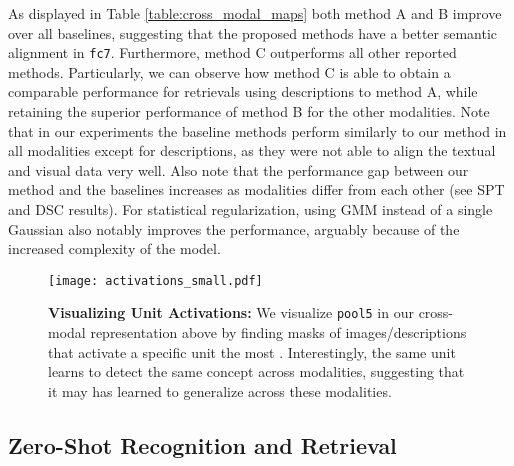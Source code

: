 \documentclass[10pt,journal,compsoc]{IEEEtran}
\begin{document}
	As displayed in Table \ref{table:cross_modal_maps} both method A and B improve over all baselines, suggesting that the proposed methods have a better semantic alignment in \texttt{fc7}. Furthermore, method C outperforms all other reported methods. Particularly, we can observe how method C is able to obtain a comparable performance for retrievals using descriptions to method A, while retaining the superior performance of method B for the other modalities. Note that in our experiments the baseline methods perform similarly to our method in all modalities except for descriptions, as they were not able to align the textual and visual data very well. Also note that the performance gap between our method and the baselines increases as modalities differ from each other (see SPT and DSC results).
	For statistical regularization, using GMM instead of a single Gaussian also notably improves the performance, arguably because of the increased complexity of the model.
	
	
	\begin{figure*}
        \begin{center}
            \texttt{[image: activations\_small.pdf]} 
        \end{center}
        \caption{\textbf{Visualizing Unit Activations:} We visualize \texttt{pool5} in our cross-modal representation above by finding masks of images/descriptions that activate a specific unit the most \cite{zhou2014object}. Interestingly, the same unit learns to detect the same concept across modalities, suggesting that it may has learned to generalize across these modalities.}
        
       
        \label{fig:activations}
    \end{figure*}
    
    
    \subsection{Zero-Shot Recognition and Retrieval}
    
\end{document}
